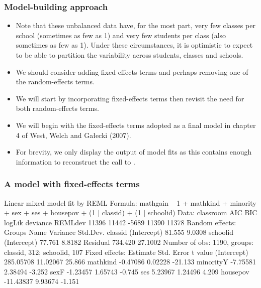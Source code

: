 \begin{frame}
  \frametitle{Model-building approach}
  \begin{itemize}
  \item Note that these unbalanced data have, for the most part,
    very few classes per school (sometimes as few as 1) and very few
    students per class (also sometimes as few as 1).  Under these
    circumstances, it is optimistic to expect to be able to partition
    the variability across students, classes and schools.
  \item We should consider adding fixed-effects terms and perhaps
    removing one of the random-effects terms.
  \item We will start by incorporating fixed-effects terms then
    revisit the need for both random-effects terms.
  \item We will begin with the fixed-effects terms adopted as a final
    model in chapter 4 of West, Welch and Ga\l{}ecki (2007).
  \item For brevity, we only display the output of model fits as this
    contains enough information to reconstruct the call to .
  \end{itemize}
\end{frame}

\begin{frame}[fragile]
  \frametitle{A model with fixed-effects terms}
\begin{Schunk}
\begin{Soutput}
Linear mixed model fit by REML 
Formula: mathgain ~ 1 + mathkind + minority + sex + ses + housepov + (1 |      classid) + (1 | schoolid) 
   Data: classroom 
   AIC   BIC logLik deviance REMLdev
 11396 11442  -5689    11390   11378
Random effects:
 Groups   Name        Variance Std.Dev.
 classid  (Intercept)  81.555   9.0308 
 schoolid (Intercept)  77.761   8.8182 
 Residual             734.420  27.1002 
Number of obs: 1190, groups: classid, 312; schoolid, 107
Fixed effects:
             Estimate Std. Error t value
(Intercept) 285.05708   11.02067  25.866
mathkind     -0.47086    0.02228 -21.133
minorityY    -7.75581    2.38494  -3.252
sexF         -1.23457    1.65743  -0.745
ses           5.23967    1.24496   4.209
housepov    -11.43837    9.93674  -1.151
\end{Soutput}
\end{Schunk}
\end{frame}

